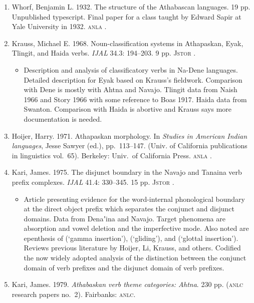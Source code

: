 \documentclass[12pt,letterpaper,oneside,article]{memoir}
\begin{document}
\begin{enumerate}
\item	Whorf, Benjamin L.
	1932.
	The structure of the Athabascan languages.
	19 pp.
	Unpublished typescript. 
	Final paper for a class taught by Edward Sapir at Yale University in 1932.
	\textsc{anla} .
\item	Krauss, Michael E.
	1968.
	Noun-classification systems in Athapaskan, Eyak, Tlingit, and Haida verbs.
	\textit{IJAL} 34.3: 194–203.
	9 pp.
	\textsc{Jstor} .
	\begin{itemize}
	\item	Description and analysis of classificatory verbs in Na-Dene languages.
		Detailed description for Eyak based on Krauss’s fieldwork.
		Comparison with Dene is mostly with Ahtna and Navajo.
		Tlingit data from Naish 1966 and Story 1966 with some reference to Boas 1917.
		Haida data from Swanton.
		Comparison with Haida is abortive and Krauss says more documentation is needed.
	\end{itemize}
\item	Hoijer, Harry.
	1971.
	Athapaskan morphology.
	In \textit{Studies in American Indian languages}, Jesse Sawyer (ed.), pp.\ 113–147.
	(Univ. of California publications in linguistics vol.\ 65).
	Berkeley: Univ.\ of California Press.
	\textsc{anla} .
\item	Kari, James.
	1975.
	The disjunct boundary in the Navajo and Tanaina verb prefix complexes.
	\textit{IJAL} 41.4: 330–345.
	15 pp.
	\textsc{Jstor} .
	\begin{itemize}
	\item	Article presenting evidence for the word-internal phonological boundary
		at the direct object prefix which separates the conjunct and disjunct domains.
		Data from Denaʼina and Navajo.
		Target phenomena are  absorption and vowel deletion and
		the  imperfective mode.
		Also noted are epenthesis of  (‘gamma insertion’),  (‘gliding’),
		and  (‘glottal insertion’).
		Reviews previous literature by Hoijer, Li, Krauss, and others.
		Codified the now widely adopted analysis of the distinction between the
		conjunct domain of verb prefixes and the disjunct domain of verb prefixes.
	\end{itemize}
\item	Kari, James.
	1979.
	\textit{Athabaskan verb theme categories: Ahtna}.
	230 pp.
	(\textsc{anlc} research papers no.\ 2).
	Fairbanks: \textsc{anlc}.
	\begin{itemize}

\end{itemize}
\end{enumerate}
\end{document}
